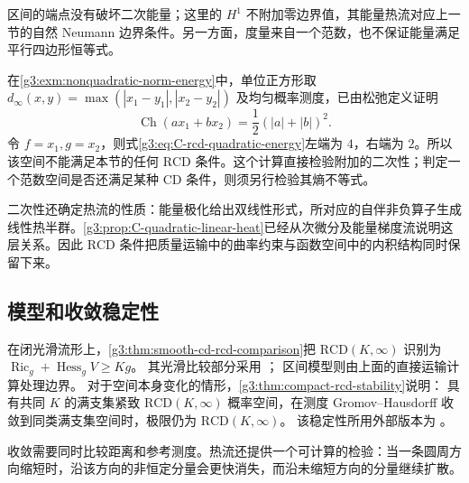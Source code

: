 区间的端点没有破坏二次能量；这里的 \(H^1\) 不附加零边界值，其能量热流对应上一节的自然 Neumann 边界条件。另一方面，度量来自一个范数，也不保证能量满足平行四边形恒等式。

\ProseParagraphBreak
在\cref{g3:exm:nonquadratic-norm-energy}中，单位正方形取
\(d_\infty(x,y)=\max(|x_1-y_1|,|x_2-y_2|)\) 及均匀概率测度，已由松弛定义证明
\[
	\operatorname{Ch}(ax_1+bx_2)=\frac12(|a|+|b|)^2.
\]
令 \(f=x_1,g=x_2\)，则式\eqref{g3:eq:C-rcd-quadratic-energy}左端为 \(4\)，右端为 \(2\)。所以该空间不能满足本节的任何 \(\mathrm{RCD}\) 条件。这个计算直接检验附加的二次性；判定一个范数空间是否还满足某种 \(\mathrm{CD}\) 条件，则须另行检验其熵不等式。

\ProseParagraphBreak
二次性还确定热流的性质：能量极化给出双线性形式，所对应的自伴非负算子生成线性热半群。\cref{g3:prop:C-quadratic-linear-heat}已经从次微分及能量梯度流说明这层关系。因此 \(\mathrm{RCD}\) 条件把质量运输中的曲率约束与函数空间中的内积结构同时保留下来。

\subsection{模型和收敛稳定性}
\label{g3:subsec:C03:03}

在闭光滑流形上，\cref{g3:thm:smooth-cd-rcd-comparison}把
\(\mathrm{RCD}(K,\infty)\) 识别为
\(\operatorname{Ric}_g+\operatorname{Hess}_gV\ge Kg\)。
其光滑比较部分采用
\cite[定理7.3(b)，第948--949页]{LottVillani2009Transport}；
区间模型则由上面的直接运输计算处理边界。
对于空间本身变化的情形，\cref{g3:thm:compact-rcd-stability}说明：
具有共同 \(K\) 的满支集紧致 \(\mathrm{RCD}(K,\infty)\) 概率空间，在测度 Gromov--Hausdorff 收敛到同类满支集空间时，极限仍为 \(\mathrm{RCD}(K,\infty)\)。
该稳定性所用外部版本为
\cite[定理7.2，2013年11月19日作者稿第54页]{GigliMondinoSavare2015Stability}。

\ProseParagraphBreak
收敛需要同时比较距离和参考测度。热流还提供一个可计算的检验：当一条圆周方向缩短时，沿该方向的非恒定分量会更快消失，而沿未缩短方向的分量继续扩散。

